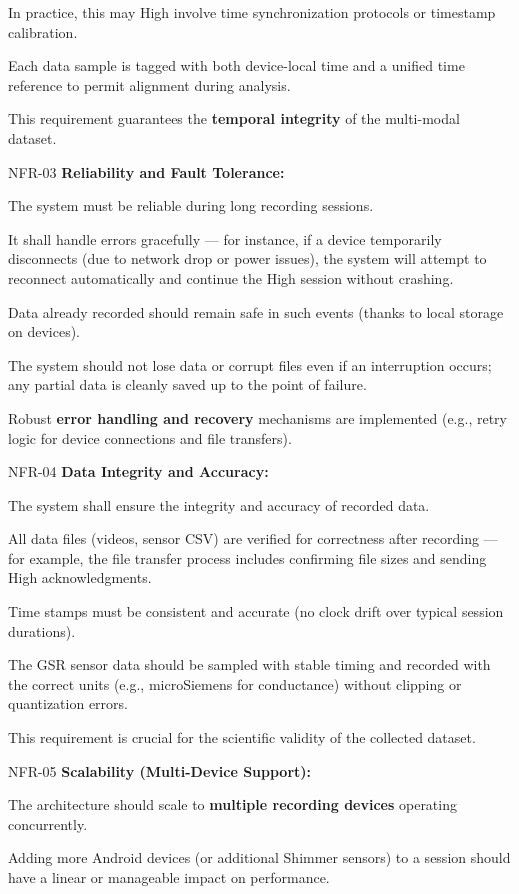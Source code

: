 In practice, this may High involve time synchronization protocols or timestamp
calibration.

Each data sample is tagged with both device-local time and a unified time reference
to permit alignment during analysis.

This requirement guarantees the \textbf{temporal integrity}
 of the multi-modal dataset.

NFR-03 \textbf{Reliability and Fault Tolerance:}

The system must be reliable during long recording sessions.

It shall handle errors gracefully --- for instance, if a device temporarily
disconnects (due to network drop or power issues), the system will attempt to
reconnect automatically and continue the High session without crashing.

Data already recorded should remain safe in such events (thanks to local storage on
devices).

The system should not lose data or corrupt files even if an interruption occurs; any
partial data is cleanly saved up to the point of failure.

Robust \textbf{error handling and recovery}
 mechanisms are implemented (e.g., retry logic for device connections and file
 transfers).

NFR-04 \textbf{Data Integrity and Accuracy:}

The system shall ensure the integrity and accuracy of recorded data.

All data files (videos, sensor CSV) are verified for correctness after recording ---
for example, the file transfer process includes confirming file sizes and sending
High acknowledgments.

Time stamps must be consistent and accurate (no clock drift over typical session
durations).

The GSR sensor data should be sampled with stable timing and recorded with the
correct units (e.g., microSiemens for conductance) without clipping or quantization
errors.

This requirement is crucial for the scientific validity of the collected dataset.

NFR-05 \textbf{Scalability (Multi-Device Support):}

The architecture should scale to \textbf{multiple recording devices}
 operating concurrently.

Adding more Android devices (or additional Shimmer sensors) to a session should have
a linear or manageable impact on performance.

